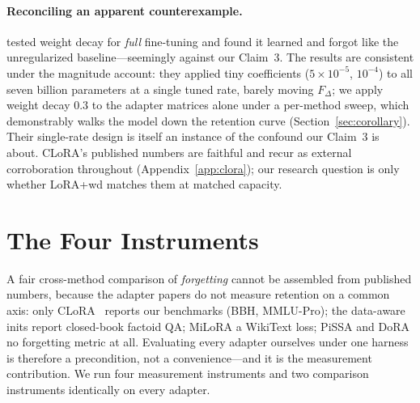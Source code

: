 \documentclass[11pt]{article}
\newcommand{\dw}{F_{\Delta}}
\begin{document}
\paragraph{Reconciling an apparent counterexample.} \citet{biderman2024lora}
tested weight decay for \emph{full} fine-tuning and found it learned and forgot
like the unregularized baseline---seemingly against our Claim~3. The results are
consistent under the magnitude account: they applied tiny coefficients
($5\times10^{-5}$, $10^{-4}$) to all seven billion parameters at a single tuned
rate, barely moving $\dw$; we apply weight decay $0.3$ to the adapter matrices
alone under a per-method sweep, which demonstrably walks the model down the
retention curve (Section~\ref{sec:corollary}). Their single-rate design is itself
an instance of the confound our Claim~3 is about. CLoRA's published numbers are
faithful and recur as external corroboration throughout
(Appendix~\ref{app:clora}); our research question is only whether LoRA{+}wd
matches them at matched capacity.

\section{The Four Instruments}\label{sec:instruments}
A fair cross-method comparison of \emph{forgetting} cannot be assembled from
published numbers, because the adapter papers do not measure retention on a common
axis: only CLoRA~\citep{clora} reports our benchmarks (BBH, MMLU-Pro); the
data-aware inits report closed-book factoid QA; MiLoRA a WikiText loss; PiSSA and
DoRA no forgetting metric at all. Evaluating every adapter ourselves under one
harness is therefore a precondition, not a convenience---and it is the
measurement contribution. We run four measurement instruments and two comparison
instruments identically on every adapter.
\end{document}
